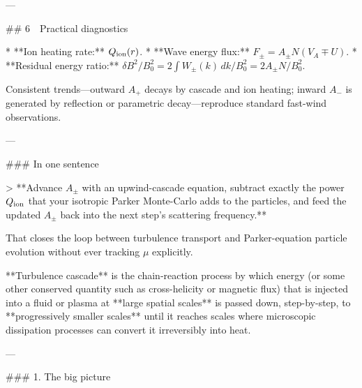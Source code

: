---

## 6 Practical diagnostics

* **Ion heating rate:** $Q_{\rm ion}(r)$.
* **Wave energy flux:** $F_\pm=A_\pm N (V_A\!\mp\!U)$.
* **Residual energy ratio:** $\delta B^2/B_0^2 = 2\! \int W_\pm(k)\,dk /B_0^2 = 2A_\pm N/B_0^2$.

Consistent trends—outward $A_+$ decays by cascade and ion heating; inward $A_-$ is generated by reflection or parametric decay—reproduce standard fast-wind observations.

---

### In one sentence

> **Advance $A_\pm$ with an upwind-cascade equation, subtract exactly the power $Q_{\rm ion}$ that your isotropic Parker Monte-Carlo adds to the particles, and feed the updated $A_\pm$ back into the next step’s scattering frequency.**

That closes the loop between turbulence transport and Parker-equation particle evolution without ever tracking $\mu$ explicitly.


**Turbulence cascade** is the chain‐reaction process by which energy (or some other conserved quantity such as cross-helicity or magnetic flux) that is injected into a fluid or plasma at **large spatial scales** is passed down, step-by-step, to **progressively smaller scales** until it reaches scales where microscopic dissipation processes can convert it irreversibly into heat.

---

### 1.  The big picture

